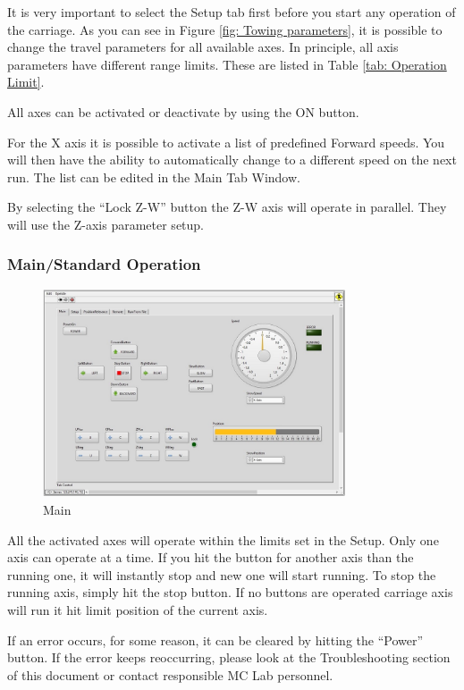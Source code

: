 \documentclass[a4paper,english]{report}
\begin{document}
It is very important to select the Setup tab first before you start any operation of the carriage. As you can see in Figure \ref{fig: Towing parameters}, it is possible to change the travel parameters for all available axes. In principle, all axis parameters have different range limits. These are listed in Table \ref{tab: Operation Limit}.

All axes can be activated or deactivate by using the ON button.

For the X axis it is possible to activate a list of predefined Forward speeds. You will then have the ability to automatically change to a different speed on the next run. The list can be edited in the Main Tab Window.

By selecting the ``Lock Z-W'' button the Z-W axis will operate in parallel. They will use the Z-axis parameter setup.

\subsubsection*{Main/Standard Operation}
\begin{figure}[htb!]
	\centering \includegraphics[width=0.8\textwidth]{fig/towing_main} 
	\caption{Main}
	\label{fig: Towing main}
\end{figure}

All the activated axes will operate within the limits set in the Setup. Only one axis can operate at a time. If you hit the button for another axis than the running one, it will instantly stop and new one will start running. To stop the running axis, simply hit the stop button. If no buttons are operated carriage axis will run it hit limit position of the current axis.

If an error occurs, for some reason, it can be cleared by hitting the ``Power'' button. If the error keeps reoccurring, please look at the Troubleshooting section of this document or contact responsible MC Lab personnel.
\end{document}
